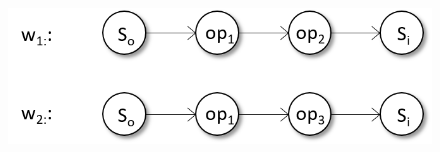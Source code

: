 \begin{example}
\begin{figure}[h]
\centering
\includegraphics[width=0.65\columnwidth]{Figures/ex_widget_requirements}
\label{fig:ex_widget_requirements}
\end{figure}


\end{example}
